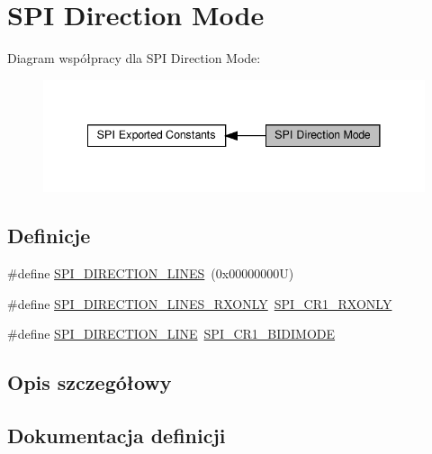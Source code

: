 \hypertarget{group___s_p_i___direction}{}\section{S\+PI Direction Mode}
\label{group___s_p_i___direction}
Diagram współpracy dla S\+PI Direction Mode\+:\nopagebreak
\begin{figure}[H]
\begin{center}
\leavevmode
\includegraphics[width=341pt]{group___s_p_i___direction}
\end{center}
\end{figure}
\subsection*{Definicje}
\begin{DoxyCompactItemize}
\item 
\#define \hyperlink{group___s_p_i___direction_gaa7cb7f4bf4eebbf91bcfaeb17ebba7f3}{S\+P\+I\+\_\+\+D\+I\+R\+E\+C\+T\+I\+O\+N\+\_\+L\+I\+N\+ES}~(0x00000000\+U)
\item 
\#define \hyperlink{group___s_p_i___direction_ga444826cf94667f75503f54704b2fb391}{S\+P\+I\+\_\+\+D\+I\+R\+E\+C\+T\+I\+O\+N\+\_\+L\+I\+N\+E\+S\+\_\+\+R\+X\+O\+N\+LY}~\hyperlink{group___peripheral___registers___bits___definition_ga9ffecf774b84a8cdc11ab1f931791883}{S\+P\+I\+\_\+\+C\+R1\+\_\+\+R\+X\+O\+N\+LY}
\item 
\#define \hyperlink{group___s_p_i___direction_gab0f684caf5f1d6ac1e73d90a4778ab93}{S\+P\+I\+\_\+\+D\+I\+R\+E\+C\+T\+I\+O\+N\+\_\+L\+I\+NE}~\hyperlink{group___peripheral___registers___bits___definition_ga43608d3c2959fc9ca64398d61cbf484e}{S\+P\+I\+\_\+\+C\+R1\+\_\+\+B\+I\+D\+I\+M\+O\+DE}
\end{DoxyCompactItemize}


\subsection{Opis szczegółowy}


\subsection{Dokumentacja definicji}
\mbox{\label{group___s_p_i___direction_gab0f684caf5f1d6ac1e73d90a4778ab93}} 
